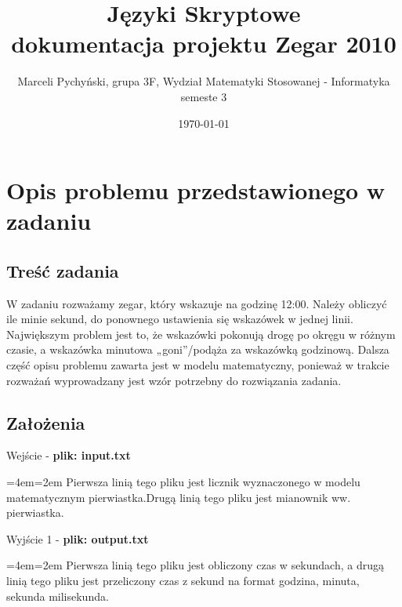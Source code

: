 \documentclass[12pt,a4paper]{article}
\newenvironment{blockquote}{%
  \par%
  \medskip
  \leftskip=4em\rightskip=2em%
  \noindent\ignorespaces}{%
  \par\medskip}
\begin{document}
	
	\title{Języki Skryptowe\\\small{dokumentacja projektu Zegar 2010}}
	\author{Marceli Pychyński, grupa 3F, Wydział Matematyki Stosowanej - Informatyka semeste 3}
	\date{\today}

	\maketitle
	\newpage
	
	\tableofcontents
	
	\newpage
	\section{Opis problemu przedstawionego w zadaniu}
	
    	\subsection{Treść zadania}
        	W zadaniu rozważamy zegar, który wskazuje na godzinę 12:00. Należy obliczyć ile minie sekund, do ponownego ustawienia się wskazówek w jednej linii. Największym problem jest to, że wskazówki pokonują drogę po okręgu w różnym czasie, a wskazówka minutowa „goni”/podąża za wskazówką godzinową. Dalsza część opisu problemu zawarta jest w modelu matematyczny, ponieważ w trakcie rozważań wyprowadzany jest wzór potrzebny do rozwiązania zadania.
        
        
        \subsection{Założenia}
        
            Wejście - \textbf{plik: input.txt}
            \begin{blockquote}
                Pierwsza linią tego pliku jest licznik wyznaczonego w modelu matematycznym pierwiastka.Drugą linią tego pliku jest mianownik ww. pierwiastka.
            \end{blockquote}
            
            \noindent Wyjście 1 - \textbf{plik: output.txt}
            
            \begin{blockquote}
                Pierwsza linią tego pliku jest obliczony czas w sekundach, a drugą linią tego pliku jest przeliczony czas z sekund na format godzina, minuta, sekunda milisekunda.
                \end{blockquote}
                
\end{document}
